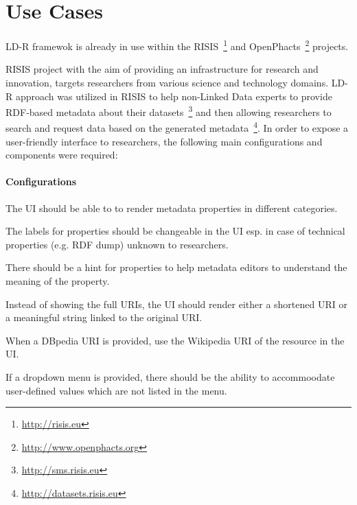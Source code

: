 \documentclass{acm_proc_article-sp}
\begin{document}
\section{Use Cases}

LD-R framewok is already in use within the RISIS~\footnote{\url{http://risis.eu}} and OpenPhacts~\footnote{\url{http://www.openphacts.org}} projects.

RISIS project with the aim of providing an infrastructure for research and innovation, targets researchers from various science and technology domains.
LD-R approach was utilized in RISIS to help non-Linked Data experts to provide RDF-based metadata about their datasets~\footnote{\url{http://sms.risis.eu}} and then allowing researchers to search and request data based on the generated metadata~\footnote{\url{http://datasets.risis.eu}}.
In order to expose a user-friendly interface to researchers, the following main configurations and components were required:

\paragraph{Configurations}
\begin{compactitem}
 \item The UI should be able to to render metadata properties in different categories.
 \item The labels for properties should be changeable in the UI esp. in case of technical properties (e.g. RDF dump) unknown to researchers.
 \item There should be a hint for properties to help metadata editors to understand the meaning of the property.
 \item Instead of showing the full URIs, the UI should render either a shortened URI or a meaningful string linked to the original URI. 
 \item When a DBpedia URI is provided, use the Wikipedia URI of the resource in the UI.
 \item If a dropdown menu is provided, there should be the ability to accommoodate user-defined values which are not listed in the menu.
 
\end{compactitem}
\end{document}
